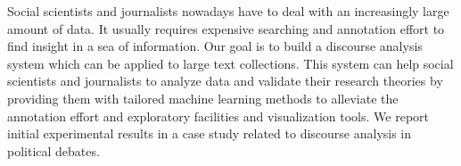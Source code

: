 Social scientists and journalists nowadays have to deal with an increasingly large amount of data. It usually requires expensive searching and annotation effort to find insight in a sea of information. Our goal is to build a discourse analysis system which can be applied to large text collections. This system can help social scientists and journalists to analyze data and validate their research theories by providing them with tailored machine learning methods to alleviate the annotation effort and exploratory facilities and visualization tools. We report initial experimental results in a case study related to discourse analysis in political debates.
